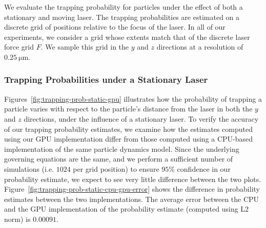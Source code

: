 
We evaluate the trapping probability for particles under the effect of
both a stationary and moving laser.  The trapping probabilities are
estimated on a discrete grid of positions relative to the focus of the
laser.  In all of our experiments, we consider a grid whose extents
match that of the discrete laser force grid $F$.  We sample this
grid in the $y$ and $z$ directions at a resolution of
$\SI{0.25}{\micro\meter}$.

\subsubsection{Trapping Probabilities under a Stationary Laser}


Figures~\ref{fig:trapping-prob-static-gpu} illustrates how the probability
of trapping a particle varies with respect to the particle's distance
from the laser in both the $y$ and $z$ directions, under the influence
of a stationary laser. To verify the accuracy of our trapping
probability estimates, we examine how the estimates computed using our
GPU implementation differ from those computed using a CPU-based
implementation of the same particle dynamics model. Since the
underlying governing equations are the same, and we perform a
sufficient number of simulations (i.e. $1024$ per grid position) to
ensure $95\%$ confidence in our probability estimate, we expect to see
very little difference between the two plots. Figure~\ref{fig:trapping-prob-static-cpu-gpu-error} 
shows the difference in probability estimates between the two implementations.
The average error between the CPU and the GPU implementation of the
probability estimate (computed using L2 norm) is $0.00091$.


